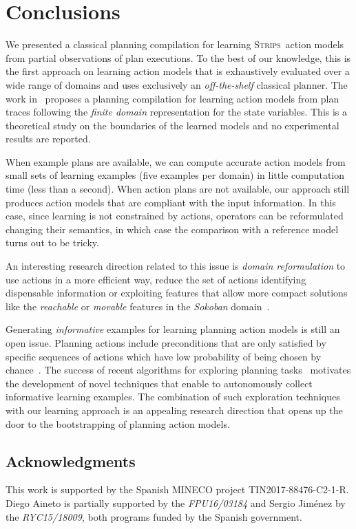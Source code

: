 \documentclass[runningheads]{llncs}
\newcommand{\strips}{\textsc{Strips}}     %
\begin{document}
\section{Conclusions}
We presented a classical planning compilation for learning \strips\ action models from partial observations of plan executions. To the best of our knowledge, this is the first approach on learning action models that is exhaustively evaluated over a wide range of domains and uses exclusively an {\em off-the-shelf} classical planner. The work in~\cite{SternJ17} proposes a planning compilation for learning action models from plan traces following the {\em finite domain} representation for the state variables. This is a theoretical study on the boundaries of the learned models and no experimental results are reported.

When example plans are available, we can compute accurate action models from small sets of learning examples (five examples per domain) in little computation time (less than a second). When action plans are not available, our approach still produces action models that are compliant with the input information. In this case, since learning is not constrained by actions, operators can be reformulated changing their semantics, in which case the comparison with a reference model turns out to be tricky.

An interesting research direction related to this issue is {\em domain reformulation} to use actions in a more efficient way, reduce the set of actions identifying dispensable information or exploiting features that allow more compact solutions like the {\em reachable} or {\em movable} features in the {\em Sokoban} domain~\cite{IvankovicH15}.

Generating {\em informative} examples for learning planning action models is still an open issue. Planning actions include preconditions that are only satisfied by specific sequences of actions which have low probability of being chosen by chance~\cite{fern2004learning}. The success of recent algorithms for exploring planning tasks~\cite{FrancesRLG17} motivates the development of novel techniques that enable to autonomously collect informative learning examples. The combination of such exploration techniques with our learning approach is an appealing research direction that opens up the door to the bootstrapping of planning action models.


\subsection*{Acknowledgments}
This work is supported by the Spanish MINECO project TIN2017-88476-C2-1-R. Diego Aineto is partially supported by the {\it FPU16/03184} and Sergio Jim\'enez by the {\it RYC15/18009}, both programs funded by the Spanish government.



\end{document}
